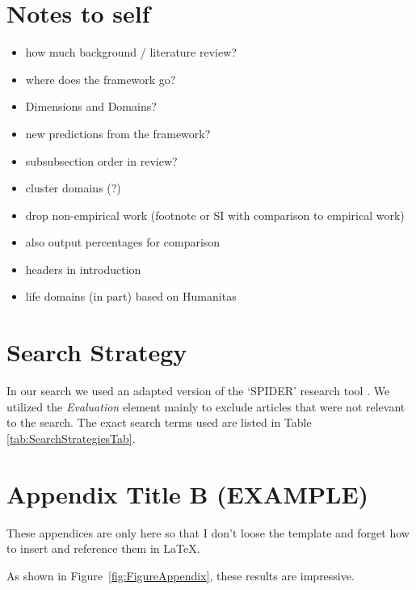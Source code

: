 \documentclass[man, 12pt, a4paper]{apa7}
\begin{document}
\section{Notes to self}
\begin{itemize}
  \item how much background / literature review?
  \item where does the framework go?
  \item Dimensions and Domains?
  \item new predictions from the framework?
  \item subsubsection order in review?
  \item cluster domains (?)
  \item drop non-empirical work (footnote or SI with comparison to empirical work)
  \item also output percentages for comparison
  \item headers in introduction
  \item life domains (in part) based on Humanitas
\end{itemize}

\printbibliography

\appendix

\section{Search Strategy}
\label{app:AppendixSearchStrategy}

In our search we used an adapted version of the `SPIDER' research tool \citep[e.g.,][]{Cooke2012}. We utilized the \textit{Evaluation} element mainly to exclude articles that were not relevant to the search. The exact search terms used are listed in Table \ref{tab:SearchStrategiesTab}.





\section{Appendix Title B (EXAMPLE)}
\label{app:AppendixLableB}

These appendices are only here so that I don't loose the template and forget how to insert and reference them in \LaTeX.

As shown in Figure~\ref{fig:FigureAppendix}, these results are impressive. 
\end{document}
